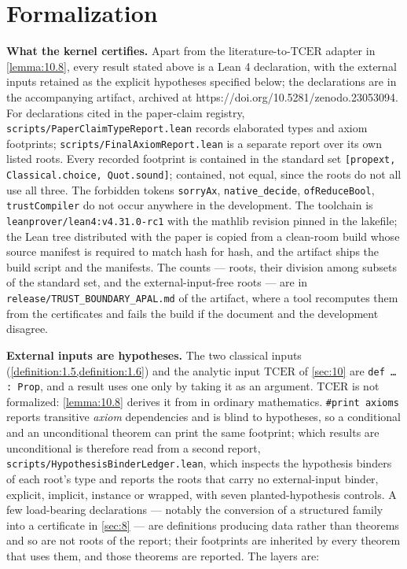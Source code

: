 \section{Formalization}\label{sec:12}
\textbf{What the kernel certifies.} Apart from the literature-to-$\mathrm{TCER}$ adapter in \cref{lemma:10.8}, every result stated above is a Lean 4 declaration, with the external inputs retained as the explicit hypotheses specified below; the declarations are in the accompanying artifact, archived at https://doi.org/10.5281/zenodo.23053094. For declarations cited in the paper-claim registry, \texttt{scripts/PaperClaimTypeReport.\allowbreak{}lean} records elaborated types and axiom footprints; \texttt{scripts/FinalAxiomReport.\allowbreak{}lean} is a separate report over its own listed roots. Every recorded footprint is contained in the standard set \texttt{[propext, Classical.\allowbreak{}choice, Quot.\allowbreak{}sound]}; contained, not equal, since the roots do not all use all three. The forbidden tokens \texttt{sorryAx}, \texttt{native\_\allowbreak{}decide}, \texttt{ofReduceBool}, \texttt{trustCompiler} do not occur anywhere in the development. The toolchain is \texttt{leanprover/lean4:v4.\allowbreak{}31.\allowbreak{}0-rc1} with the mathlib revision pinned in the lakefile; the Lean tree distributed with the paper is copied from a clean-room build whose source manifest is required to match hash for hash, and the artifact ships the build script and the manifests. The counts — roots, their division among subsets of the standard set, and the external-input-free roots — are in \texttt{release/TRUST\_\allowbreak{}BOUNDARY\_\allowbreak{}APAL.\allowbreak{}md} of the artifact, where a tool recomputes them from the certificates and fails the build if the document and the development disagree.

\textbf{External inputs are hypotheses.} The two classical inputs (\cref{definition:1.5,definition:1.6}) and the analytic input $\mathrm{TCER}$ of \cref{sec:10} are \texttt{def … : Prop}, and a result uses one only by taking it as an argument. $\mathrm{TCER}$ is not formalized: \cref{lemma:10.8} derives it from \cite{KK26} in ordinary mathematics. \texttt{\#print axioms} reports transitive \emph{axiom} dependencies and is blind to hypotheses, so a conditional and an unconditional theorem can print the same footprint; which results are unconditional is therefore read from a second report, \texttt{scripts/HypothesisBinderLedger.\allowbreak{}lean}, which inspects the hypothesis binders of each root's type and reports the roots that carry no external-input binder, explicit, implicit, instance or wrapped, with seven planted-hypothesis controls. A few load-bearing declarations — notably the conversion of a structured family into a certificate in \cref{sec:8} — are definitions producing data rather than theorems and so are not roots of the report; their footprints are inherited by every theorem that uses them, and those theorems are reported. The layers are:

